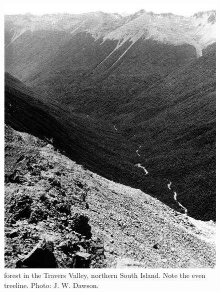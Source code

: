\begin{figure}[t]
	\begin{minipage}[t]{\textwidth}
		\begin{minipage}[t]{(\textwidth-\fgap) * \real{0.501}}
			\centering
			\includegraphics[width=\textwidth]{graphics/figure71nothofagus-forest.jpg}
			\caption[Nothofagus forest in the Travers Valley]{ forest in the Travers Valley, northern South Island.
			Note the even treeline.
			Photo: J. W. Dawson.}%
			\label{fig:71nothofagus-forest}
		\end{minipage}\hspace{\fgap}%
		\begin{minipage}[t]{(\textwidth-\fgap) * \real{0.499}}
			\centering

\end{minipage}
\end{minipage}
\end{figure}
